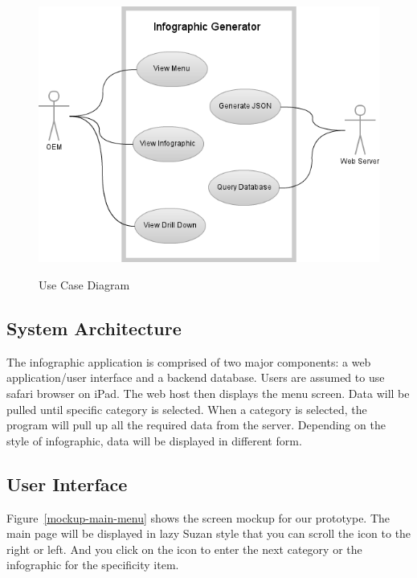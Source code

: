 \documentclass[11pt,a4paper,oneside]{article}
\begin{document}
\begin{figure}[!]
\caption{Use Case Diagram}
\includegraphics[width=1\textwidth]{images/Capstone_-_Use_Case_Diagram.png}\\   
\end{figure}


\subsection{System Architecture}

The infographic application is comprised of two major components: a web application/user interface and a backend database. Users are assumed to use safari browser on iPad. The web host then displays the menu screen. Data will be pulled until specific category is selected. When a category is selected, the program will pull up all the required data from the server. Depending on the style of infographic, data will be displayed in different form.\\

\subsection{User Interface}

Figure~\ref{mockup-main-menu} shows the screen mockup for our prototype.   The main page will be displayed in lazy Suzan style that you can scroll the icon to the right or left.  And you click on the icon to enter the next category or the infographic for the specificity item.\\
\end{document}
